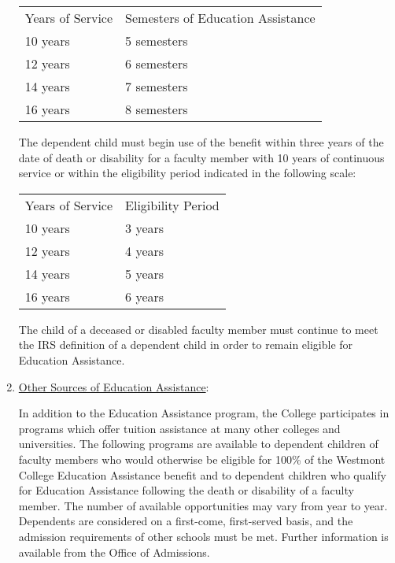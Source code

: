 \begin{enumerate}[label=\alph*)]
{\begin{enumerate}[label=\arabic*)]
{								\begin{center}
									\begin{tabular}{ ll }
										Years of Service & Semesters of Education Assistance \\
										10 years         & 5 semesters                       \\
										12 years         & 6 semesters                       \\
										14 years         & 7 semesters                       \\
										16 years         & 8 semesters                       \\
									\end{tabular}
								\end{center}
								The dependent child must begin use of the benefit within three years of the date of death or disability for a faculty member with 10 years of continuous service or within the eligibility period indicated in the following scale:
								\begin{center}
									\begin{tabular}{ ll }
										Years of Service & Eligibility Period \\
										10 years         & 3 years            \\
										12 years         & 4 years            \\
										14 years         & 5 years            \\
										16 years         & 6 years            \\
									\end{tabular}
								\end{center}
								The child of a deceased or disabled faculty member must continue to meet the IRS definition of a dependent child in order to remain eligible for Education Assistance.
							}
						\end{enumerate}
					}
					\item{\underline{Other Sources of Education Assistance}:

						In addition to the Education Assistance program, the
						College participates in programs which offer tuition
						assistance at many other colleges and universities.  The
						following programs are available to dependent children
						of faculty members who would otherwise be eligible for
						100\% of the Westmont College Education Assistance
						benefit and to dependent children who qualify for
						Education Assistance following the death or disability
						of a faculty member.  The number of available
						opportunities may vary from year to year.  Dependents
						are considered on a first-come, first-served basis, and
						the admission requirements of other schools must be met.
						Further information is available from the Office of
						Admissions.

}
\end{enumerate}
